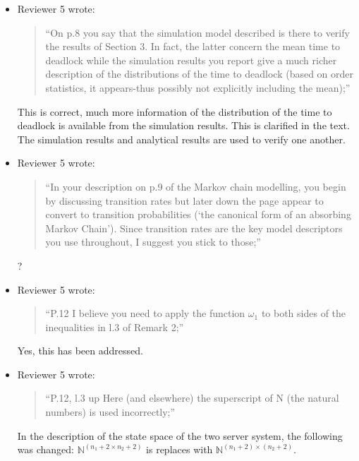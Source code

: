 \documentclass{article}
\begin{document}
\begin{itemize}
\item Reviewer 5 wrote:
\begin{quote}
``On p.8 you say that the simulation model described is there to verify the
results of Section 3.
In fact, the latter concern the mean time to deadlock while the simulation
results you report give a much richer description of the distributions of the
time to deadlock (based on order statistics, it appears-thus possibly not
explicitly including the mean);''
\end{quote}
This is correct, much more information of the distribution of the time to
deadlock is available from the simulation results.
This is clarified in the text.
The simulation results and analytical results are used to verify one another.

\item Reviewer 5 wrote:
\begin{quote}
``In your description on p.9 of the Markov chain modelling, you begin by
discussing transition rates but later down the page appear to convert to
transition probabilities (‘the canonical form of an absorbing Markov Chain’).
Since transition rates are the key model descriptors you use throughout,
I suggest you stick to those;''
\end{quote}
?

\item Reviewer 5 wrote:
\begin{quote}
``P.12 I believe you need to apply the function $\omega_1$ to both sides of the
inequalities in l.3 of Remark 2;''
\end{quote}
Yes, this has been addressed.

\item Reviewer 5 wrote:
\begin{quote}
``P.12, l.3 up Here (and elsewhere) the superscript of N (the natural numbers)
is used incorrectly;''
\end{quote}
In the description of the state space of the two server system, the following
was changed: $\mathbb{N}^{(n_1+2\times n_2+2)}$ is replaces with
$\mathbb{N}^{(n_1+2)\times (n_2+2)}$.



\end{itemize}
\end{document}

